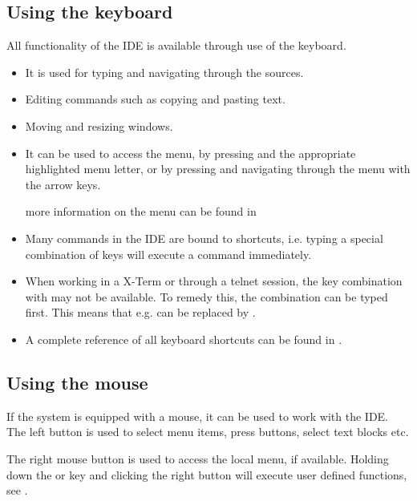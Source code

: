 \subsection{Using the keyboard} 
All functionality of the IDE is available through use of the keyboard.
\begin{itemize}
\item It is used for typing and navigating through the sources.
\item Editing commands such as copying and pasting text.
\item Moving and resizing windows.
\item It can be used to access the menu, by pressing  and the
appropriate highlighted menu letter, or by pressing  and
navigating through the menu with the arrow keys.

more information on the menu can be found in 
\item Many commands in the IDE are bound to shortcuts, i.e. typing a special
combination of keys will execute a command immediately.
\end{itemize}
\begin{remark}
\begin{itemize}
\item When working in a \linux X-Term or through a telnet session, the
key combination with  may not be available. To remedy this, the 
 combination can be typed first. This means that e.g. 
can be replaced by .
\item A complete reference of all keyboard shortcuts can be found in
.
\end{itemize}
\end{remark}
% 
%
\subsection{Using the mouse}
\label{suse:mouseusage}
If the system is equipped with a mouse, it can be used to work with the
IDE. The left button is used to select menu items, press buttons, select
text blocks etc. 

The right mouse button is used to access the local menu, if available.
Holding down the  or  key and clicking the right
button will execute user defined functions,  see .

